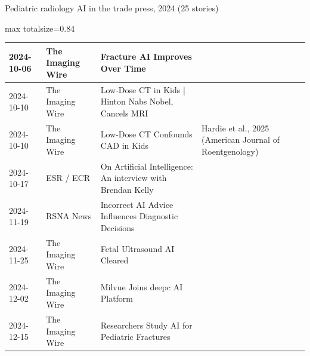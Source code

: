 \documentclass[aspectratio=169]{beamer}
\begin{document}
\begin{frame}[category=Newsletters]{Pediatric radiology AI in the trade press, 2024 (25 stories)}
\begin{adjustbox}{max totalsize={\textwidth}{0.84\textheight}}
\begin{tabular}{|l|l|>{\raggedright\arraybackslash}p{}|>{\raggedright\arraybackslash}p{}|}
2024-10-06 & The Imaging Wire & Fracture AI Improves Over Time &  \\ \hline
2024-10-10 & The Imaging Wire & Low-Dose CT in Kids | Hinton Nabs Nobel, Cancels MRI &  \\ \hline
2024-10-10 & The Imaging Wire & Low-Dose CT Confounds CAD in Kids & Hardie et al., 2025 (American Journal of Roentgenology) \\ \hline
2024-10-17 & ESR / ECR & On Artificial Intelligence: An interview with Brendan Kelly &  \\ \hline
2024-11-19 & RSNA News & Incorrect AI Advice Influences Diagnostic Decisions &  \\ \hline
2024-11-25 & The Imaging Wire & Fetal Ultrasound AI Cleared &  \\ \hline
2024-12-02 & The Imaging Wire & Milvue Joins deepc AI Platform &  \\ \hline
2024-12-15 & The Imaging Wire & Researchers Study AI for Pediatric Fractures &  \\ \hline
\end{tabular}
\end{adjustbox}
\end{frame}
\end{document}
